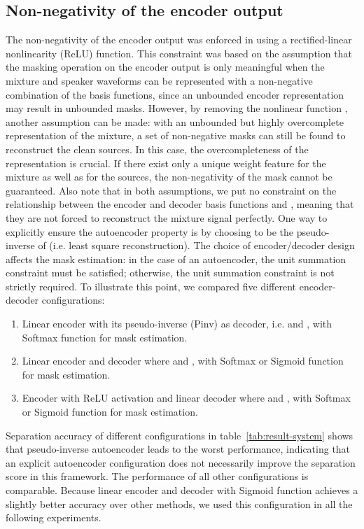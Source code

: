 \documentclass[journal]{IEEEtran}
\begin{document}
\subsection{Non-negativity of the encoder output}
\label{sec:exp-design}
The non-negativity of the encoder output was enforced in \cite{luo2018tasnet, luo2018real} using a rectified-linear nonlinearity (ReLU) function. This constraint was based on the assumption that the masking operation on the encoder output is only meaningful when the mixture and speaker waveforms can be represented with a non-negative combination of the basis functions, since an unbounded encoder representation may result in unbounded masks. However, by removing the nonlinear function , another assumption can be made: with an unbounded but highly overcomplete representation of the mixture, a set of non-negative masks can still be found to reconstruct the clean sources. In this case, the overcompleteness of the representation is crucial. If there exist only a unique weight feature for the mixture as well as for the sources, the non-negativity of the mask cannot be guaranteed. Also note that in both assumptions, we put no constraint on the relationship between the encoder and decoder basis functions  and , meaning that they are not forced to reconstruct the mixture signal perfectly. One way to explicitly ensure the autoencoder property is by choosing  to be the pseudo-inverse of  (i.e. least square reconstruction). The choice of encoder/decoder design affects the mask estimation: in the case of an autoencoder, the unit summation constraint must be satisfied; otherwise, the unit summation constraint is not strictly required. To illustrate this point, we compared five different encoder-decoder configurations: 
\begin{enumerate}
    \item Linear encoder with its pseudo-inverse (Pinv) as decoder, i.e.  and , with Softmax function for mask estimation.
    \item Linear encoder and decoder where  and , with Softmax or Sigmoid function for mask estimation.
    \item Encoder with ReLU activation and linear decoder where  and , with Softmax or Sigmoid function for mask estimation.
\end{enumerate}
Separation accuracy of different configurations in table~\ref{tab:result-system} shows that pseudo-inverse autoencoder leads to the worst performance, indicating that an explicit autoencoder configuration does not necessarily improve the separation score in this framework. The performance of all other configurations is comparable. Because linear encoder and decoder with Sigmoid function achieves a slightly better accuracy over other methods, we used this configuration in all the following experiments.
\end{document}
